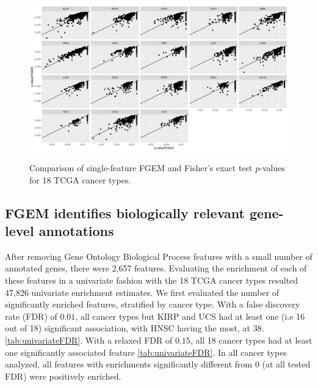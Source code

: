 \begin{figure}
\centering
\includegraphics[width=.9\linewidth]{img/fisher_vs_fgem.png}\label{fig:fisher_vs_fgem}
\caption{Comparison of single-feature FGEM and Fisher's exact test $p$-values for 18 TCGA cancer types.}
\end{figure}

\subsection{FGEM identifies biologically relevant gene-level annotations}\label{sec:orgd52f2ca}

After removing Gene Ontology Biological Process features with a small number of annotated genes, there were 2,657 features.  Evaluating the enrichment of each of these features in a univariate fashion with the 18 TCGA cancer types resulted 47,826 univariate enrichment estimates.  We first evaluated the number of significantly enriched features, stratified by cancer type.  With a false discovery rate (FDR) of $0.01$, all cancer types but KIRP and UCS had at least one (i.e 16 out of 18) significant association, with HNSC having the most, at 38. \ref{tab:univariateFDR}.  With a relaxed FDR of $0.15$, all 18 cancer types had at least one significantly associated feature \ref{tab:univariateFDR}. In all cancer types analyzed, all features with enrichments significantly different from 0 (at all tested FDR) were positively enriched.  


